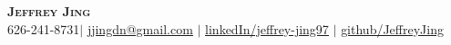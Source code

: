 \documentclass[]{resume-openfont}
\begin{document}
\newcommand{\yourName}{Jeffrey Jing}
\newcommand{\yourEmail}{jjingdn@gmail.com}
\newcommand{\yourPhone}{626-241-8731}
\newcommand{\githubUserName}{JeffreyJing}
\newcommand{\linkedInUserName}{jeffrey-jing97}


\begin{center}
    \textbf{\Huge \scshape \yourName} \\ \vspace{1pt}
    \small \yourPhone $|$ \href{mailto:\yourEmail}{\underline{\yourEmail}} $|$ 
    \href{https://linkedin.com/in/\linkedInUserName}{\underline{linkedIn/\linkedInUserName}} $|$
    \href{https://github.com/\githubUserName}{\underline{github/\githubUserName}}
\end{center}


\end{document}
